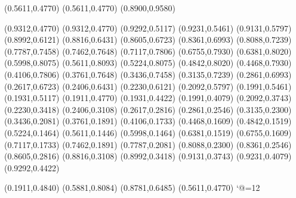 \PST@Border(0.5611,0.4770)
(0.5611,0.4770)
(0.8900,0.9580)

\PST@Dashed(0.9312,0.4770)
(0.9312,0.4770)
(0.9292,0.5117)
(0.9231,0.5461)
(0.9131,0.5797)
(0.8992,0.6121)
(0.8816,0.6431)
(0.8605,0.6723)
(0.8361,0.6993)
(0.8088,0.7239)
(0.7787,0.7458)
(0.7462,0.7648)
(0.7117,0.7806)
(0.6755,0.7930)
(0.6381,0.8020)
(0.5998,0.8075)
(0.5611,0.8093)
(0.5224,0.8075)
(0.4842,0.8020)
(0.4468,0.7930)
(0.4106,0.7806)
(0.3761,0.7648)
(0.3436,0.7458)
(0.3135,0.7239)
(0.2861,0.6993)
(0.2617,0.6723)
(0.2406,0.6431)
(0.2230,0.6121)
(0.2092,0.5797)
(0.1991,0.5461)
(0.1931,0.5117)
(0.1911,0.4770)
(0.1931,0.4422)
(0.1991,0.4079)
(0.2092,0.3743)
(0.2230,0.3418)
(0.2406,0.3108)
(0.2617,0.2816)
(0.2861,0.2546)
(0.3135,0.2300)
(0.3436,0.2081)
(0.3761,0.1891)
(0.4106,0.1733)
(0.4468,0.1609)
(0.4842,0.1519)
(0.5224,0.1464)
(0.5611,0.1446)
(0.5998,0.1464)
(0.6381,0.1519)
(0.6755,0.1609)
(0.7117,0.1733)
(0.7462,0.1891)
(0.7787,0.2081)
(0.8088,0.2300)
(0.8361,0.2546)
(0.8605,0.2816)
(0.8816,0.3108)
(0.8992,0.3418)
(0.9131,0.3743)
(0.9231,0.4079)
(0.9292,0.4422)

\PST@Fillcircle(0.1911,0.4840)
\PST@Fillcircle(0.5881,0.8084)
\PST@Fillcircle(0.8781,0.6485)
\PST@Circle(0.5611,0.4770)
\catcode`@=12
\fi
\endpspicture